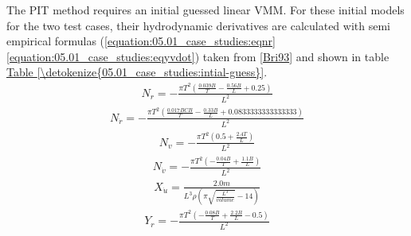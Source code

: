 \documentclass[review]{elsarticle}
\begin{document}
\sphinxAtStartPar
The PIT method requires an initial guessed linear VMM. For these initial models for the two test cases, their hydrodynamic derivatives are calculated with semi empirical formulas (\autoref{equation:05.01_case_studies:eqnr}\sphinxhyphen{}\autoref{equation:05.01_case_studies:eqyvdot}) taken from {[}\hyperlink{cite.bibligraphy:id45}{Bri93}{]} and shown in table \hyperref[\detokenize{05.01_case_studies:intial-guess}]{Table \ref{\detokenize{05.01_case_studies:intial-guess}}}.
\begin{equation}\label{equation:05.01_case_studies:eqnr}
\begin{split}\displaystyle N_{r} = - \frac{\pi T^{2} \left(\frac{0.039 B}{T} - \frac{0.56 B}{L} + 0.25\right)}{L^{2}}\end{split}
\end{equation}\begin{equation}\label{equation:05.01_case_studies:eqnrdot}
\begin{split}\displaystyle N_{\dot{r}} = - \frac{\pi T^{2} \left(\frac{0.017 B CB}{T} - \frac{0.33 B}{L} + 0.0833333333333333\right)}{L^{2}}\end{split}
\end{equation}\begin{equation}\label{equation:05.01_case_studies:eqnv}
\begin{split}\displaystyle N_{v} = - \frac{\pi T^{2} \left(0.5 + \frac{2.4 T}{L}\right)}{L^{2}}\end{split}
\end{equation}\begin{equation}\label{equation:05.01_case_studies:eqnvdot}
\begin{split}\displaystyle N_{\dot{v}} = - \frac{\pi T^{2} \left(- \frac{0.04 B}{T} + \frac{1.1 B}{L}\right)}{L^{2}}\end{split}
\end{equation}\begin{equation}\label{equation:05.01_case_studies:eqxudot}
\begin{split}\displaystyle X_{\dot{u}} = \frac{2.0 m}{L^{3} \rho \left(\pi \sqrt{\frac{L^{3}}{volume}} - 14\right)}\end{split}
\end{equation}\begin{equation}\label{equation:05.01_case_studies:eqyr}
\begin{split}\displaystyle Y_{r} = - \frac{\pi T^{2} \left(- \frac{0.08 B}{T} + \frac{2.2 B}{L} - 0.5\right)}{L^{2}}\end{split}

\end{equation}
\end{document}
